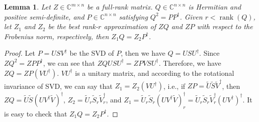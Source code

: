 \documentclass{article}
\newcommand{\rank}{\operatorname*{rank}}
\theoremstyle{plain}
\newtheorem{lemma}[theorem]{Lemma}
\theoremstyle{definition}
\theoremstyle{remark}
\theoremstyle{remark}
\begin{document}
    \begin{lemma} \label{lemma: SVD_half}
      Let $Z \in \mathbb{C}^{m \times n}$ be a full-rank matrix. $Q \in \mathbb{C}^{n \times n}$ is Hermitian and positive semi-definite, and $P \in \mathbb{C}^{n \times n}$ satisfying $Q^2 = PP^{\dagger}$. Given $r < \rank(Q)$, let $Z_1$ and $Z_2$ be the best rank-$r$ approximation of $ZQ$ and $ZP$ with respect to the Frobenius norm, respectively, then $Z_1 Q = Z_2 P^{\dagger}$.
    \end{lemma}

    \begin{proof}
      Let $P = USV^{\dagger}$ be the SVD of $P$, then we have $Q = U S U^{\dagger}$. Since $ZQ^2 = ZPP^{\dagger}$, we can see that $ZQUSU^{\dagger} = ZPVSU^{\dagger}$. Therefore, we have $ZQ = ZP(VU^{\dagger})$. $VU^{\dagger}$ is a unitary matrix, and according to the rotational invariance of SVD, we can say that $Z_1 = Z_2(VU^{\dagger})$, i.e., if $ZP = \widetilde{U} \widetilde{S} \widetilde{V}^{\dagger}$, then $ZQ = \widetilde{U} \widetilde{S} (UV^{\dagger}\widetilde{V})^{\dagger}$, $Z_2 = \widetilde{U}_r \widetilde{S}_r \widetilde{V}_r^{\dagger}$, and $Z_1 = \widetilde{U}_r \widetilde{S}_r (UV^{\dagger}\widetilde{V})_r^{\dagger} = \widetilde{U}_r \widetilde{S}_r \widetilde{V}_r^{\dagger} (UV^{\dagger})^{\dagger}$. It is easy to check that $Z_1 Q = Z_2 P^{\dagger}$.
    \end{proof}
\end{document}
